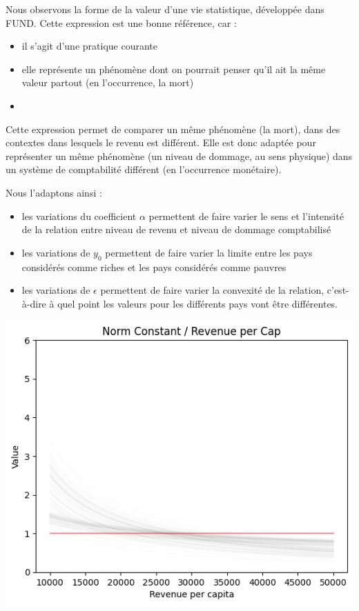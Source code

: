 \begin{methodbox}
Nous observons la forme de la valeur d'une vie statistique, développée dans FUND. Cette expression est une bonne référence, car : 

\begin{itemize}
    \item il s'agit d'une pratique courante
    \item elle représente un phénomène dont on pourrait penser qu'il ait la même valeur partout (en l'occurrence, la mort)
    \item 
\end{itemize}

Cette expression permet de comparer un même phénomène (la mort), dans des contextes dans lesquels le revenu est différent. Elle est donc adaptée pour représenter un même phénomène (un niveau de dommage, au sens physique) dans un système de comptabilité différent (en l'occurrence monétaire). 

Nous l'adaptons ainsi : 

\begin{itemize}
    \item les variations du coefficient $\alpha$ permettent de faire varier le sens et l'intensité de la relation entre niveau de revenu et niveau de dommage comptabilisé
    \item les variations de $y_0$ permettent de faire varier la limite entre les pays considérés comme riches et les pays considérés comme pauvres
    \item les variations de $\epsilon$ permettent de faire varier la convexité de la relation, c'est-à-dire à quel point les valeurs pour les différents pays vont être différentes. 
\end{itemize}

\vspace{2cm}

\centering
\includegraphics[width=0.75\linewidth]{figures/coef.png}

\end{methodbox}
